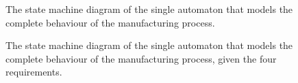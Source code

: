 \begin{sidewaysfigure}
  \begin{figure}[H]\centering
    \scalebox{0.8}{}
    \caption{The state machine diagram of the single automaton that models the
      complete behaviour of the manufacturing process.}
    \label{fig:fsm_2}
  \end{figure}
\end{sidewaysfigure}

\begin{sidewaysfigure}
  \begin{figure}[H]\centering
    \scalebox{0.8}{}
    \caption{The state machine diagram of the single automaton that models the
      complete behaviour of the manufacturing process, given the four
      requirements.}
    \label{fig:fsm_3}
  \end{figure}
\end{sidewaysfigure}
